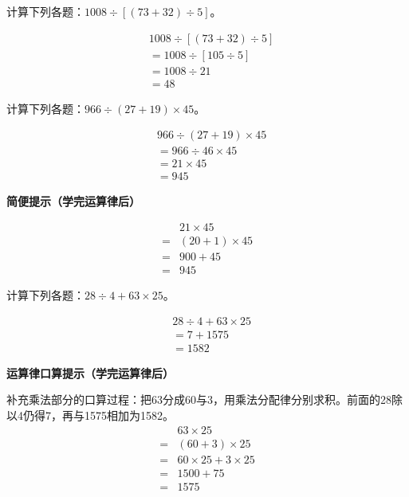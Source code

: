 计算下列各题：\(1008\div[(73+32)\div5]\)。\par
\begin{BookAnswer}
\[\begin{aligned}&1008\div[(73+32)\div5]\\&=1008\div[105\div5]\\&=1008\div21\\&=48\end{aligned}\]
\end{BookAnswer}

计算下列各题：\(966\div(27+19)\times45\)。\par
\begin{BookAnswer}
\[\begin{aligned}&966\div(27+19)\times45\\&=966\div46\times45\\&=21\times45\\&=945\end{aligned}\]\par\textbf{简便提示（学完运算律后）}\par \[\begin{aligned}&21\times45\\={}&(20+1)\times45\\={}&900+45\\={}&945\end{aligned}\]
\end{BookAnswer}

计算下列各题：\(28\div4+63\times25\)。\par
\begin{BookAnswer}
\[\begin{aligned}&28\div4+63\times25\\&=7+1575\\&=1582\end{aligned}\]\par\textbf{运算律口算提示（学完运算律后）}\par 补充乘法部分的口算过程：把63分成60与3，用乘法分配律分别求积。前面的28除以4仍得7，再与1575相加为1582。\[\begin{aligned}&63\times25\\={}&(60+3)\times25\\={}&60\times25+3\times25\\={}&1500+75\\={}&1575\end{aligned}\]
\end{BookAnswer}

